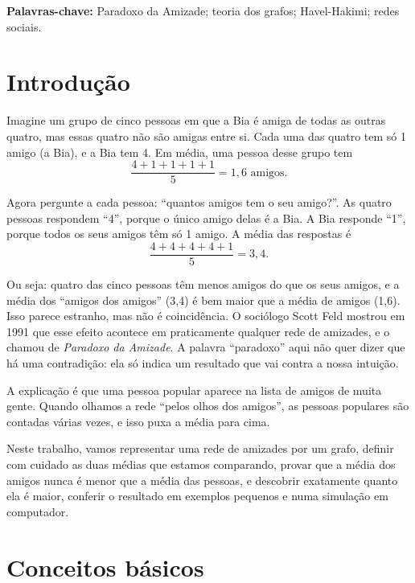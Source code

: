 \documentclass[12pt,a4paper]{article}
\theoremstyle{plain}
\theoremstyle{definition}
\theoremstyle{remark}
\begin{document}
\medskip
\noindent\textbf{Palavras-chave:}
Paradoxo da Amizade; teoria dos grafos;
Havel-Hakimi; redes sociais.


\newpage
\tableofcontents
\newpage
{}

\section{Introdução}

Imagine um grupo de cinco pessoas em que a Bia é amiga de todas as
outras quatro, mas essas quatro não são amigas entre si. Cada uma das
quatro tem só 1 amigo (a Bia), e a Bia tem 4. Em média, uma pessoa
desse grupo tem
\[
\frac{4+1+1+1+1}{5} = 1{,}6 \text{ amigos.}
\]

Agora pergunte a cada pessoa: “quantos amigos tem o seu amigo?”. As
quatro pessoas respondem “4”, porque o único amigo delas é a Bia. A Bia
responde “1”, porque todos os seus amigos têm só 1 amigo. A média das
respostas é
\[
\frac{4+4+4+4+1}{5} = 3{,}4.
\]

Ou seja: quatro das cinco pessoas têm menos amigos do que os seus
amigos, e a média dos “amigos dos amigos” (3,4) é bem maior que a média
de amigos (1,6). Isso parece estranho, mas não é coincidência. O
sociólogo Scott Feld mostrou em 1991 \cite{feld} que esse efeito
acontece em praticamente qualquer rede de amizades, e o chamou de
\emph{Paradoxo da Amizade}. A palavra “paradoxo” aqui não quer dizer
que há uma contradição: ela só indica um resultado que vai contra a
nossa intuição.

A explicação é que uma pessoa popular aparece na lista de amigos de
muita gente. Quando olhamos a rede “pelos olhos dos amigos”, as pessoas
populares são contadas várias vezes, e isso puxa a média para cima.

Neste trabalho, vamos representar uma rede de amizades por um grafo, definir com cuidado as duas médias que estamos comparando, provar que a média dos amigos nunca é menor que a média das pessoas, e descobrir exatamente quanto ela é maior, conferir o resultado em exemplos pequenos e numa simulação em computador.

\section{Conceitos básicos}\label{sec:conceitos}
\end{document}
